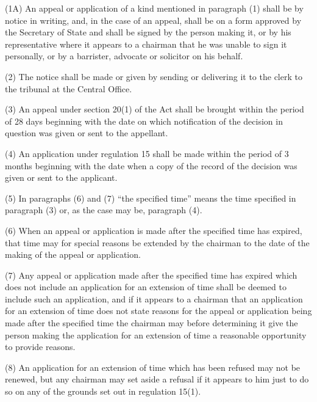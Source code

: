 \documentclass[a4paper]{article}
\begin{document}

(1A) An appeal or application of a kind mentioned in paragraph (1) shall be by notice in writing, and, in the case of an appeal, shall be on a form approved by the Secretary of State and shall be signed by the person making it, or by his representative where it appears to a chairman that he was unable to sign it personally, or by a barrister, advocate or solicitor on his behalf.

(2) The notice shall be made or given by sending or delivering it to the clerk to the tribunal at the Central Office.

(3) An appeal under section 20(1) of the Act shall be brought within the period of 28 days beginning with the date on which notification of the decision in question was given or sent to the appellant.

(4) An application under regulation 15 shall be made within the period of 3 months beginning with the date when a copy of the record of the decision was given or sent to the applicant.

(5) In paragraphs (6) and (7) “the specified time” means the time specified in paragraph (3) or, as the case may be, paragraph (4).

(6) When an appeal or application is made after the specified time has expired, that time may for special reasons be extended by the chairman to the date of the making of the appeal or application.

(7) Any appeal or application made after the specified time has expired which does not include an application for an extension of time shall be deemed to include such an application, and if it appears to a chairman that an application for an extension of time does not state reasons for the appeal or application being made after the specified time the chairman may before determining it give the person making the application for an extension of time a reasonable opportunity to provide reasons.

(8) An application for an extension of time which has been refused may not be renewed, but any chairman may set aside a refusal if it appears to him just to do so on any of the grounds set out in regulation 15(1).
\end{document}

